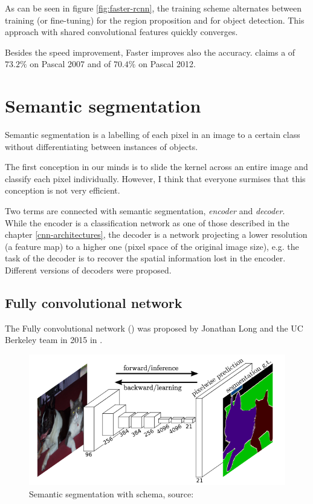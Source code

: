 As can be seen in figure \ref{fig:faster-rcnn}, the training scheme alternates 
between training (or fine-tuning) for the region proposition and for object 
detection. This approach with shared convolutional features quickly converges.

Besides the speed improvement, Faster  improves also the accuracy. 
\cite{faster-rcnn} claims a  of $73.2 \%$ on Pascal  2007 and of 
$70.4 \%$ on Pascal  2012.


\section{Semantic segmentation}
\label{semantic-segmentation}

Semantic segmentation is a labelling of each pixel in an image to a certain 
class without differentiating between instances of objects.

The first conception in our minds is to slide the kernel across an entire image 
and classify each pixel individually. However, I think that everyone surmises 
that this conception is not very efficient.

Two terms are connected with semantic segmentation, \textit{encoder} and 
\textit{decoder}. While the encoder is a classification network as one of those 
described in the chapter \ref{cnn-architectures}, the decoder is a network 
projecting a lower resolution (a feature map) to a higher one (pixel space of 
the original image size), e.g. the task of the decoder is to recover the spatial 
information lost in the encoder. Different versions of decoders were proposed.

\subsection{Fully convolutional network}
\label{fcns}

The Fully convolutional network () was proposed by Jonathan Long and the 
UC Berkeley team in 2015 in \cite{fcns}.

\begin{figure}[H]
   \centering
	\includegraphics[width=.8\linewidth]{./pictures/fcns.png}
	\caption[Fully convolutional network]{Semantic segmentation with  
schema, source: \cite{fcns}}
      \label{fig:fcns}
\end{figure}

